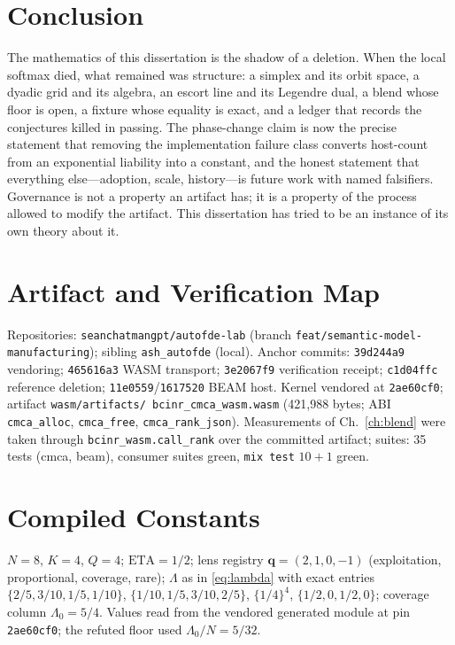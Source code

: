 \documentclass[12pt,oneside]{report}
\theoremstyle{plain}
\theoremstyle{definition}
\theoremstyle{remark}
\newcommand{\code}[1]{\texttt{#1}}
\newcommand{\commit}[1]{\texttt{#1}}
\begin{document}
\chapter{Conclusion}
\label{ch:conclusion}

The mathematics of this dissertation is the shadow of a deletion. When
the local softmax died, what remained was structure: a simplex and its
orbit space, a dyadic grid and its algebra, an escort line and its
Legendre dual, a blend whose floor is open, a fixture whose equality
is exact, and a ledger that records the conjectures killed in passing.
The phase-change claim is now the precise statement that removing the
implementation failure class converts host-count from an exponential
liability into a constant, and the honest statement that everything
else---adoption, scale, history---is future work with named
falsifiers. Governance is not a property an artifact has; it is a
property of the process allowed to modify the artifact. This
dissertation has tried to be an instance of its own theory about it.

\appendix

\chapter{Artifact and Verification Map}
\label{app:artifacts}

Repositories: \code{seanchatmangpt/autofde-lab} (branch
\code{feat/semantic-model-manufacturing}); sibling \code{ash\_autofde}
(local). Anchor commits: \commit{39d244a9} vendoring;
\commit{465616a3} WASM transport; \commit{3e2067f9} verification
receipt; \commit{c1d04ffc} reference deletion;
\commit{11e0559}/\commit{1617520} BEAM host. Kernel vendored at
\commit{2ae60cf0}; artifact \code{wasm/artifacts/
bcinr\_cmca\_wasm.wasm} (421{,}988 bytes; ABI \code{cmca\_alloc},
\code{cmca\_free}, \code{cmca\_rank\_json}). Measurements of
Ch.~\ref{ch:blend} were taken through \code{bcinr\_wasm.call\_rank}
over the committed artifact; suites: 35 tests (cmca, beam), consumer
suites green, \code{mix test} $10{+}1$ green.

\chapter{Compiled Constants}
\label{app:constants}

$N=8$, $K=4$, $Q=4$; $\mathrm{ETA}=1/2$; lens registry
$\mathbf{q}=(2,1,0,-1)$ (exploitation, proportional, coverage, rare);
$\Lambda$ as in \eqref{eq:lambda} with exact entries
$\{2/5,3/10,1/5,1/10\}$, $\{1/10,1/5,3/10,2/5\}$, $\{1/4\}^4$,
$\{1/2,0,1/2,0\}$; coverage column $\Lambda_0=5/4$. Values read from
the vendored generated module at pin \commit{2ae60cf0}; the refuted
floor used $\Lambda_0/N=5/32$.
\end{document}
